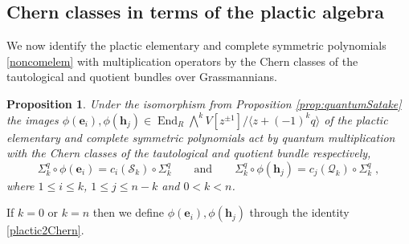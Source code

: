 \documentclass[12pt]{amsart}
\newcommand{\cS}{\mathcal{S}}
\newcommand{\cQ}{\mathcal{Q}}
\newcommand{\End}{\operatorname{End}}
\newcommand{\bs}[1]{\boldsymbol{#1}}
\newcommand{\ring}{R}
\newtheorem{prop}{Proposition}[section]
\numberwithin{equation}{section}
\numberwithin{figure}{section}
\begin{document}
    \subsection{Chern classes in terms of the plactic algebra}
    We now identify the plactic elementary and complete symmetric polynomials \eqref{noncomelem} with multiplication operators by the Chern classes of the tautological and quotient bundles over Grassmannians.
    \begin{prop}\label{placticandChern}
        Under the isomorphism from Proposition \ref{prop:quantumSatake} the images $\phi(\bs{e}_i),\phi(\bs{h}_j)\in\End_{\ring}\bigwedge^kV[z^{\pm 1}]/\langle z + (-1)^kq\rangle$ of the plactic elementary and complete symmetric polynomials act by quantum multiplication with the Chern classes of the tautological and quotient bundle respectively,
        \begin{equation}\label{plactic2Chern}
            \Sigma^q_k \circ \phi(\bs{e}_i) = c_i(\cS_k) \circ \Sigma^q_k
            \qquad\text{and}\qquad
            \Sigma^q_k \circ \phi(\bs{h}_j) = c_j(\cQ_k) \circ \Sigma^q_k\;,
        \end{equation}
        where $1\le i\le k$, $1\le j\le n-k$ and $0<k<n$. 
    \end{prop}
    If $k=0$ or $k=n$ then we define $\phi(\bs{e}_i),\phi(\bs{h}_j)$ through the identity \eqref{plactic2Chern}. 
\end{document}
